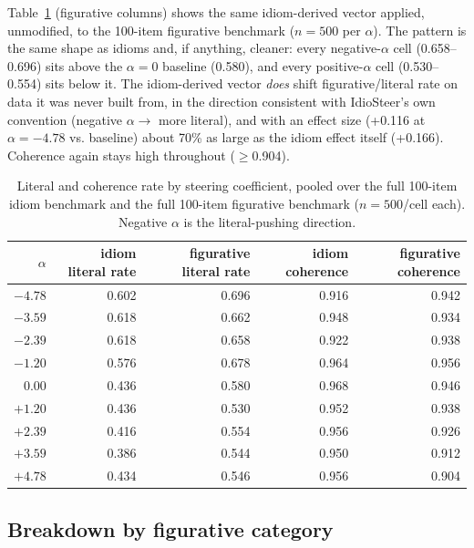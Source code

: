 \documentclass[11pt]{article}
\begin{document}
Table~\ref{tab:pooled} (figurative columns) shows the same idiom-derived vector applied,
unmodified, to the 100-item figurative benchmark ($n=500$ per $\alpha$). The pattern is
the same shape as idioms and, if anything, cleaner: every negative-$\alpha$ cell
(0.658--0.696) sits above the $\alpha=0$ baseline (0.580), and every positive-$\alpha$
cell (0.530--0.554) sits below it. The idiom-derived vector \emph{does} shift
figurative/literal rate on data it was never built from, in the direction consistent
with IdioSteer's own convention (negative $\alpha \to$ more literal), and with an effect
size (+0.116 at $\alpha=-4.78$ vs. baseline) about 70\% as large as the idiom effect
itself (+0.166). Coherence again stays high throughout ($\geq$0.904).

\begin{table}[h]
\centering
\small
\begin{tabular}{@{}rrrrr@{}}
\toprule
$\alpha$ & idiom literal rate & figurative literal rate & idiom coherence & figurative coherence \\
\midrule
$-4.78$ & 0.602 & 0.696 & 0.916 & 0.942 \\
$-3.59$ & 0.618 & 0.662 & 0.948 & 0.934 \\
$-2.39$ & 0.618 & 0.658 & 0.922 & 0.938 \\
$-1.20$ & 0.576 & 0.678 & 0.964 & 0.956 \\
$0.00$  & 0.436 & 0.580 & 0.968 & 0.946 \\
$+1.20$ & 0.436 & 0.530 & 0.952 & 0.938 \\
$+2.39$ & 0.416 & 0.554 & 0.956 & 0.926 \\
$+3.59$ & 0.386 & 0.544 & 0.950 & 0.912 \\
$+4.78$ & 0.434 & 0.546 & 0.956 & 0.904 \\
\bottomrule
\end{tabular}
\caption{Literal and coherence rate by steering coefficient, pooled over the full
100-item idiom benchmark and the full 100-item figurative benchmark ($n=500$/cell each).
Negative $\alpha$ is the literal-pushing direction.}
\label{tab:pooled}
\end{table}

\subsection{Breakdown by figurative category}
\end{document}

